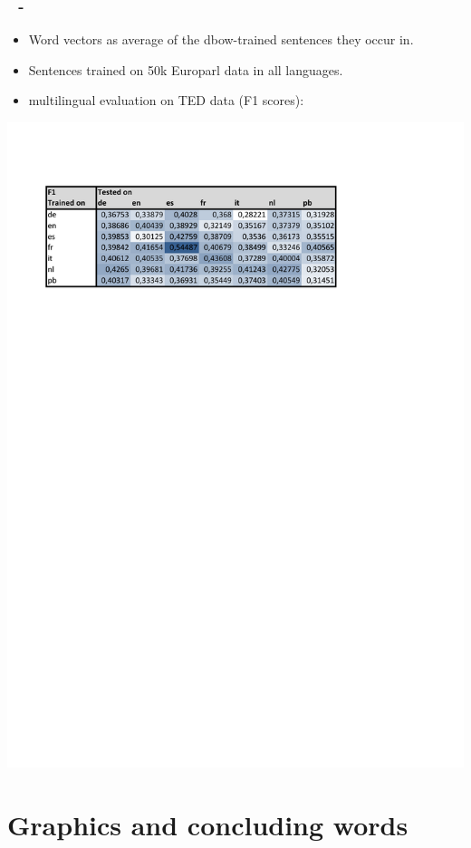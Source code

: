 \documentclass{beamer}
\newenvironment{dia}
{
\begin{frame}[fragile, environment=dia]
\frametitle{\insertsection
\ifx\insertsubsection\empty\else
      \,~-~\insertsubsection             %
   \fi}
}
{
\end{frame}
}
\begin{document}
\begin{dia}
\begin{itemize}
\item Word vectors as average of the dbow-trained sentences they occur in.
\item Sentences trained on 50k Europarl data in all languages.
\item multilingual evaluation on TED data (F1 scores):
\end{itemize}
\includegraphics[width=\textwidth]{figures/multilingdbow}
\end{dia}

\section{Graphics and concluding words}
\end{document}
